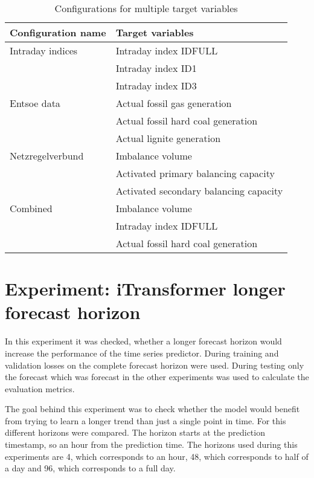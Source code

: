 \documentclass[class=scrbook, crop=false]{standalone}
\begin{document}
  \begin{table}[]
\centering
\begin{tabular}{l|l}
 Configuration name & Target variables  \\\hline
 Intraday indices&   Intraday index IDFULL\\
 		& Intraday index ID1 \\
 		& Intraday index ID3 \\ \hline
 Entsoe data & Actual fossil gas generation  \\
 		& Actual fossil hard coal generation \\
 		& Actual lignite generation \\ \hline
 Netzregelverbund & Imbalance volume  \\
 		& Activated primary balancing capacity \\
 		& Activated secondary balancing capacity \\ \hline
 Combined & Imbalance volume   \\
 		& Intraday index IDFULL \\
 		& Actual fossil hard coal generation \\ 
\end{tabular}
\caption{Configurations for multiple target variables}
\label{Table::Multiple_Targets}
\end{table}

\section{Experiment: iTransformer longer forecast horizon}

In this experiment it was checked, whether a longer forecast horizon would increase the performance of the time series predictor.
During training and validation losses on the complete forecast horizon were used.
During testing only  the forecast which was forecast in the other experiments was used to calculate the evaluation metrics.

The goal behind this experiment was to check whether the model would benefit from trying to learn a longer trend than just a single point in time.
For this different horizons were compared. The horizon starts at the prediction timestamp, so an hour from the prediction time.
The horizons used during this experiments are 4, which corresponds to an hour, 48, which corresponds to half of a day and 96, which corresponds to a full day.
\end{document}
